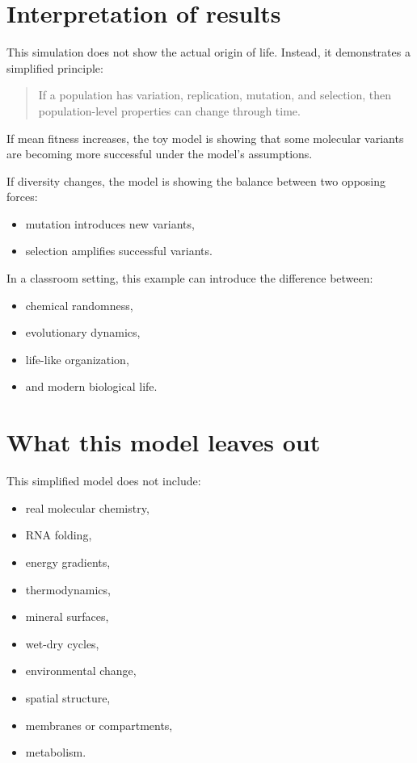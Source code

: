 \documentclass[
  oneside,
  openany]{book}
\providecommand{\tightlist}{%
  \setlength{\itemsep}{0pt}\setlength{\parskip}{0pt}}
\begin{document}
\section{Interpretation of results}\label{interpretation-of-results}

This simulation does not show the actual origin of life. Instead, it demonstrates a simplified principle:

\begin{quote}
If a population has variation, replication, mutation, and selection, then population-level properties can change through time.
\end{quote}

If mean fitness increases, the toy model is showing that some molecular variants are becoming more successful under the model's assumptions.

If diversity changes, the model is showing the balance between two opposing forces:

\begin{itemize}
\tightlist
\item
  mutation introduces new variants,
\item
  selection amplifies successful variants.
\end{itemize}

In a classroom setting, this example can introduce the difference between:

\begin{itemize}
\tightlist
\item
  chemical randomness,
\item
  evolutionary dynamics,
\item
  life-like organization,
\item
  and modern biological life.
\end{itemize}

\section{What this model leaves out}\label{what-this-model-leaves-out}

This simplified model does not include:

\begin{itemize}
\tightlist
\item
  real molecular chemistry,
\item
  RNA folding,
\item
  energy gradients,
\item
  thermodynamics,
\item
  mineral surfaces,
\item
  wet-dry cycles,
\item
  environmental change,
\item
  spatial structure,
\item
  membranes or compartments,
\item
  metabolism.
\end{itemize}
\end{document}
